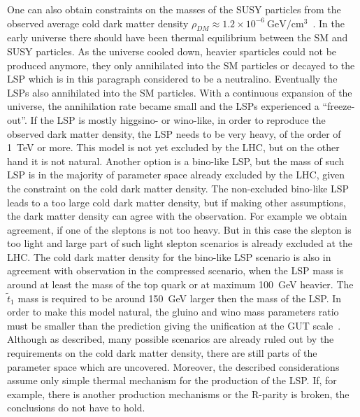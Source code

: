 One can also obtain constraints on the masses of the SUSY particles from the observed average cold dark matter density $\rho_{DM} \approx 1.2 \times 10^{-6}~\mathrm{GeV/cm^{3}}$~\cite{Ade:2015xua, Patrignani:2016xqp}.  In the early universe there should have been  thermal equilibrium between the SM and SUSY particles. As the universe cooled down, heavier sparticles could not be produced anymore, they only annihilated into the SM particles or decayed to the LSP which is in this paragraph considered to be a neutralino. Eventually the LSPs also annihilated into the SM particles. With a continuous expansion of the universe, the annihilation rate became small and the LSPs experienced a ``freeze-out''. If the LSP is mostly higgsino- or wino-like, in order to reproduce the observed dark matter density, the LSP needs to be very heavy, of the order of 1~TeV or more. This model is not yet excluded by the LHC, but on the other hand it is not natural. Another option is a bino-like LSP, but the mass of such LSP is in the majority of parameter space already excluded by the LHC, given the constraint on the cold dark matter density. The non-excluded bino-like LSP leads to a too large cold dark matter density, but if making other assumptions, the  dark matter density can agree with the observation.  For example we obtain agreement, if one of the sleptons is not too heavy.  But in this case the slepton is too light and large part of such light slepton scenarios is already excluded at the LHC. The cold dark matter density for the bino-like LSP scenario is also in agreement with observation in the compressed scenario, when the LSP mass is around at least the mass of the top quark or at maximum 100~GeV heavier. The $\tilde{t}_{1}$ mass is required to be around 150~GeV larger then the mass of the LSP. In order to make this  model natural, the gluino and wino mass parameters ratio must be smaller than the prediction giving the unification at the GUT scale~\cite{Martin:2008aw}. Although as described, many possible scenarios are already ruled out by the requirements on the cold dark matter density, there are still parts of the parameter space which are uncovered. Moreover, the described considerations assume only simple thermal mechanism for the production of the LSP. If, for example, there is another production mechanisms or the R-parity is broken, the conclusions do not have to hold.

